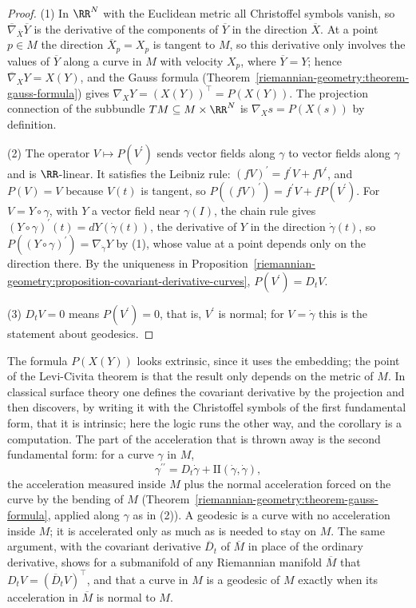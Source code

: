 \begin{proof}
(1) In $\RR^N$ with the Euclidean metric all Christoffel symbols vanish, so $\overline{\nabla}_{\overline{X}}\overline{Y}$ is the derivative of the components of $\overline{Y}$ in the direction $\overline{X}$. At a point
$p \in M$ the direction $\overline{X}_p = X_p$ is tangent to $M$, so this derivative only involves the values of $\overline{Y}$ along a curve in $M$ with velocity $X_p$, where $\overline{Y} = Y$; hence
$\overline{\nabla}_XY = X(Y)$, and the Gauss formula (Theorem~\ref{riemannian-geometry:theorem-gauss-formula}) gives $\nabla_XY = (X(Y))^\top = P(X(Y))$. The projection connection of the subbundle
$TM \subseteq M \times \RR^N$ is $\nabla_Xs = P(X(s))$ by definition.

(2) The operator $V \mapsto P(V^{\prime})$ sends vector fields along $\gamma$ to vector fields along $\gamma$ and is $\RR$-linear. It satisfies the Leibniz rule: $(fV)^{\prime} = f^{\prime}V + fV^{\prime}$, and $P(V) = V$
because $V(t)$ is tangent, so $P((fV)^{\prime}) = f^{\prime}V + fP(V^{\prime})$. For $V = Y \circ \gamma$, with $Y$ a vector field near $\gamma(I)$, the chain rule gives $(Y \circ \gamma)^{\prime}(t) = dY(\dot\gamma(t))$, the derivative of
$Y$ in the direction $\dot\gamma(t)$, so $P((Y \circ \gamma)^{\prime}) = \nabla_{\dot\gamma}Y$ by (1), whose value at a point depends only on the direction there. By the uniqueness in
Proposition~\ref{riemannian-geometry:proposition-covariant-derivative-curves}, $P(V^{\prime}) = D_tV$.

(3) $D_tV = 0$ means $P(V^{\prime}) = 0$, that is, $V^{\prime}$ is normal; for $V = \dot\gamma$ this is the statement about geodesics.
\end{proof}

The formula $P(X(Y))$ looks extrinsic, since it uses the embedding; the point of the Levi-Civita theorem is that the result only depends on the metric of $M$. In classical surface theory one
defines the covariant derivative by the projection and then discovers, by writing it with the Christoffel symbols of the first fundamental form, that it is intrinsic; here the logic runs the other way,
and the corollary is a computation. The part of the acceleration that is thrown away is the second fundamental form: for a curve $\gamma$ in $M$,
\[
\gamma^{\prime\prime} = D_t\dot\gamma + \mathrm{II}(\dot\gamma, \dot\gamma),
\]
the acceleration measured inside $M$ plus the normal acceleration forced on the curve by the bending of $M$ (Theorem~\ref{riemannian-geometry:theorem-gauss-formula}, applied along $\gamma$ as in (2)). A geodesic
is a curve with no acceleration inside $M$; it is accelerated only as much as is needed to stay on $M$. The same argument, with the covariant derivative $\overline{D}_t$ of $\overline{M}$ in place of
the ordinary derivative, shows for a submanifold of any Riemannian manifold $\overline{M}$ that $D_tV = (\overline{D}_tV)^\top$, and that a curve in $M$ is a geodesic of $M$ exactly when its acceleration in
$\overline{M}$ is normal to $M$.

